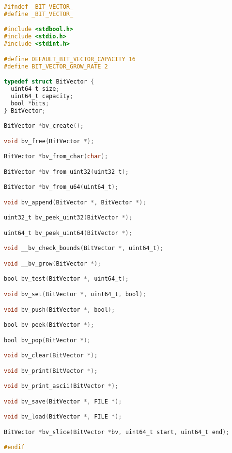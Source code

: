 \documentclass[fancychapters]{report}   	%
\begin{document}
\begin{lstlisting}[language=C,caption={bit_vector.h}]
#ifndef _BIT_VECTOR_
#define _BIT_VECTOR_

#include <stdbool.h>
#include <stdio.h>
#include <stdint.h>

#define DEFAULT_BIT_VECTOR_CAPACITY 16
#define BIT_VECTOR_GROW_RATE 2

typedef struct BitVector {
  uint64_t size;
  uint64_t capacity;
  bool *bits;
} BitVector;

BitVector *bv_create();

void bv_free(BitVector *);

BitVector *bv_from_char(char);

BitVector *bv_from_uint32(uint32_t);

BitVector *bv_from_u64(uint64_t);

void bv_append(BitVector *, BitVector *);

uint32_t bv_peek_uint32(BitVector *);

uint64_t bv_peek_uint64(BitVector *);

void __bv_check_bounds(BitVector *, uint64_t);

void __bv_grow(BitVector *);

bool bv_test(BitVector *, uint64_t);

void bv_set(BitVector *, uint64_t, bool);

void bv_push(BitVector *, bool);

bool bv_peek(BitVector *);

bool bv_pop(BitVector *);

void bv_clear(BitVector *);

void bv_print(BitVector *);

void bv_print_ascii(BitVector *);

void bv_save(BitVector *, FILE *);

void bv_load(BitVector *, FILE *);

BitVector *bv_slice(BitVector *bv, uint64_t start, uint64_t end);

#endif
\end{lstlisting}
\end{document}
